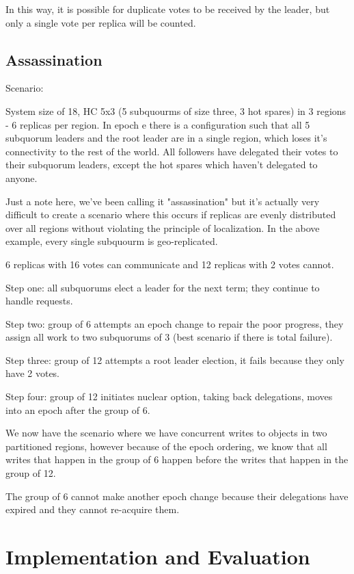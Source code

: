 \documentclass[10pt,twocolumn]{article}
\begin{document}
In this way, it is possible for duplicate votes to be received by the leader, but only a single vote per replica will be counted.

\subsection*{Assassination}

Scenario:

System size of 18, HC 5x3 (5 subquourms of size three, 3 hot spares) in 3 regions - 6 replicas per region. In epoch e there is a configuration such that all 5 subquorum leaders and the root leader are in a single region, which loses it's connectivity to the rest of the world. All followers have delegated their votes to their subquorum leaders, except the hot spares which haven't delegated to anyone.

Just a note here, we've been calling it "assassination" but it's actually very difficult to create a scenario where this occurs if replicas are evenly distributed over all regions without violating the principle of localization. In the above example, every single subquourm is geo-replicated.

6 replicas with 16 votes can communicate and 12 replicas with 2 votes cannot.

Step one: all subquorums elect a leader for the next term; they continue to handle requests.

Step two: group of 6 attempts an epoch change to repair the poor progress, they assign all work to two subquorums of 3 (best scenario if there is total failure).

Step three: group of 12 attempts a root leader election, it fails because they only have 2 votes.

Step four: group of 12 initiates nuclear option, taking back delegations, moves into an epoch after the group of 6.

We now have the scenario where we have concurrent writes to objects in two partitioned regions, however because of the epoch ordering, we know that all writes that happen in the group of 6 happen before the writes that happen in the group of 12.

The group of 6 cannot make another epoch change because their delegations have expired and they cannot re-acquire them.

\section*{Implementation and Evaluation}
\end{document}
